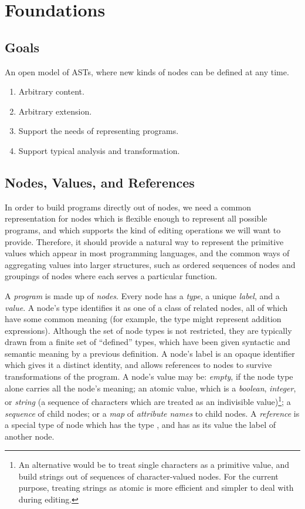 \section{Foundations}

\subsection{Goals}
An open model of ASTs, where new kinds of nodes can be defined at any time.
\begin{enumerate}
\item Arbitrary content.
\item Arbitrary extension.
\item Support the needs of representing programs.
\item Support typical analysis and transformation.
\end{enumerate}

\subsection{Nodes, Values, and References}
In order to build programs directly out of nodes, we need a common representation for nodes which is flexible enough to represent all possible programs, and which supports the kind of editing operations we will want to provide. Therefore, it should provide a natural way to represent the primitive values which appear in most programming languages, and the common ways of aggregating values into larger structures, such as ordered sequences of nodes and groupings of nodes where each serves a particular function.

A \emph{program} is made up of \emph{nodes}. Every node has a \emph{type}, a unique \emph{label}, and a \emph{value}. A node's type identifies it as one of a class of related nodes, all of which have some common meaning (for example, the type  might represent addition expressions). Although the set of node types is not restricted, they are typically drawn from a finite set of ``defined'' types, which have been given syntactic and semantic meaning by a previous definition. A node's label is an opaque identifier which gives it a distinct identity, and allows references to nodes to survive transformations of the program. A node's value may be: \emph{empty}, if the node type alone carries all the node's meaning; an atomic value, which is a \emph{boolean}, \emph{integer}, or \emph{string} (a sequence of characters which are treated as an indivisible value)\footnote{An alternative would be to treat single characters as a primitive value, and build strings out of sequences of character-valued nodes. For the current purpose, treating strings as atomic is more efficient and simpler to deal with during editing.}; a \emph{sequence} of child nodes; or a \emph{map} of \emph{attribute names} to child nodes. A \emph{reference} is a special type of node which has the type , and has as its value the label of another node.


